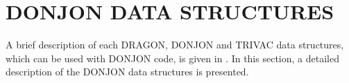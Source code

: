 \section{ DONJON DATA STRUCTURES}\label{sect:structure}

\vskip 0.2cm
\noindent
A brief description of each DRAGON, DONJON and TRIVAC data structures,
which can be used with DONJON code, is given in . In this section,
a detailed description of the DONJON data structures is presented.
\vskip 1.0cm

\vskip 1.0cm

\vskip 1.0cm

\vskip 1.0cm

\vskip 1.0cm

\vskip 1.0cm

\vskip 1.0cm

\vskip 1.0cm

\vskip 1.0cm

